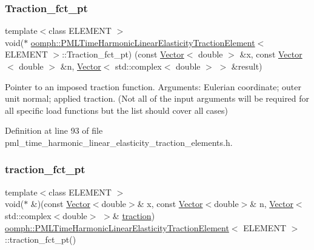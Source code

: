 \subsubsection{\texorpdfstring{Traction\+\_\+fct\+\_\+pt}{Traction\_fct\_pt}}
{\footnotesize\ttfamily template$<$class E\+L\+E\+M\+E\+NT $>$ \\
void($\ast$ \hyperlink{classoomph_1_1PMLTimeHarmonicLinearElasticityTractionElement}{oomph\+::\+P\+M\+L\+Time\+Harmonic\+Linear\+Elasticity\+Traction\+Element}$<$ E\+L\+E\+M\+E\+NT $>$\+::Traction\+\_\+fct\+\_\+pt) (const \hyperlink{classoomph_1_1Vector}{Vector}$<$ double $>$ \&x, const \hyperlink{classoomph_1_1Vector}{Vector}$<$ double $>$ \&n, \hyperlink{classoomph_1_1Vector}{Vector}$<$ std\+::complex$<$ double $>$ $>$ \&result)\hspace{0.3cm}{\ttfamily [protected]}}



Pointer to an imposed traction function. Arguments\+: Eulerian coordinate; outer unit normal; applied traction. (Not all of the input arguments will be required for all specific load functions but the list should cover all cases) 



Definition at line 93 of file pml\+\_\+time\+\_\+harmonic\+\_\+linear\+\_\+elasticity\+\_\+traction\+\_\+elements.\+h.

\mbox{\label{classoomph_1_1PMLTimeHarmonicLinearElasticityTractionElement_a093b638938640df651c4545ee236c1c3}} 
\subsubsection{\texorpdfstring{traction\+\_\+fct\+\_\+pt}{traction\_fct\_pt}}
{\footnotesize\ttfamily template$<$class E\+L\+E\+M\+E\+NT $>$ \\
void($\ast$ \&)(const \hyperlink{classoomph_1_1Vector}{Vector}$<$double$>$\& x, const \hyperlink{classoomph_1_1Vector}{Vector}$<$double$>$\& n, \hyperlink{classoomph_1_1Vector}{Vector}$<$std\+::complex$<$double$>$ $>$\& \hyperlink{classoomph_1_1PMLTimeHarmonicLinearElasticityTractionElement_ae83042121b4033f28c95ca8899b02ee8}{traction}) \hyperlink{classoomph_1_1PMLTimeHarmonicLinearElasticityTractionElement}{oomph\+::\+P\+M\+L\+Time\+Harmonic\+Linear\+Elasticity\+Traction\+Element}$<$ E\+L\+E\+M\+E\+NT $>$\+::traction\+\_\+fct\+\_\+pt()\hspace{0.3cm}{\ttfamily [inline]}}



